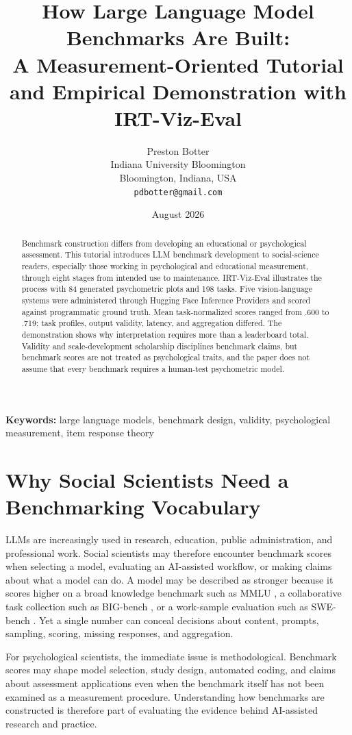 \documentclass[12pt]{article}
\title{How Large Language Model Benchmarks Are Built:\\
A Measurement-Oriented Tutorial and Empirical Demonstration with IRT-Viz-Eval}
\author{Preston Botter\\
\small Indiana University Bloomington\\
\small Bloomington, Indiana, USA\\
\small \texttt{pdbotter@gmail.com}}
\date{August 2026}
\begin{document}
\maketitle

\begin{abstract}
Benchmark construction differs from developing an educational or psychological assessment. This tutorial introduces LLM benchmark development to social-science readers, especially those working in psychological and educational measurement, through eight stages from intended use to maintenance. IRT-Viz-Eval illustrates the process with 84 generated psychometric plots and 198 tasks. Five vision-language systems were administered through Hugging Face Inference Providers and scored against programmatic ground truth. Mean task-normalized scores ranged from .600 to .719; task profiles, output validity, latency, and aggregation differed. The demonstration shows why interpretation requires more than a leaderboard total. Validity and scale-development scholarship disciplines benchmark claims, but benchmark scores are not treated as psychological traits, and the paper does not assume that every benchmark requires a human-test psychometric model.
\end{abstract}

\noindent\textbf{Keywords:} large language models, benchmark design, validity, psychological measurement, item response theory

\section{Why Social Scientists Need a Benchmarking Vocabulary}

LLMs are increasingly used in research, education, public administration, and professional work. Social scientists may therefore encounter benchmark scores when selecting a model, evaluating an AI-assisted workflow, or making claims about what a model can do. A model may be described as stronger because it scores higher on a broad knowledge benchmark such as MMLU \citep{hendrycks2021mmlu}, a collaborative task collection such as BIG-bench \citep{srivastava2023bigbench}, or a work-sample evaluation such as SWE-bench \citep{jimenez2024swebench}. Yet a single number can conceal decisions about content, prompts, sampling, scoring, missing responses, and aggregation.

For psychological scientists, the immediate issue is methodological. Benchmark scores may shape model selection, study design, automated coding, and claims about assessment applications even when the benchmark itself has not been examined as a measurement procedure. Understanding how benchmarks are constructed is therefore part of evaluating the evidence behind AI-assisted research and practice.
\end{document}
